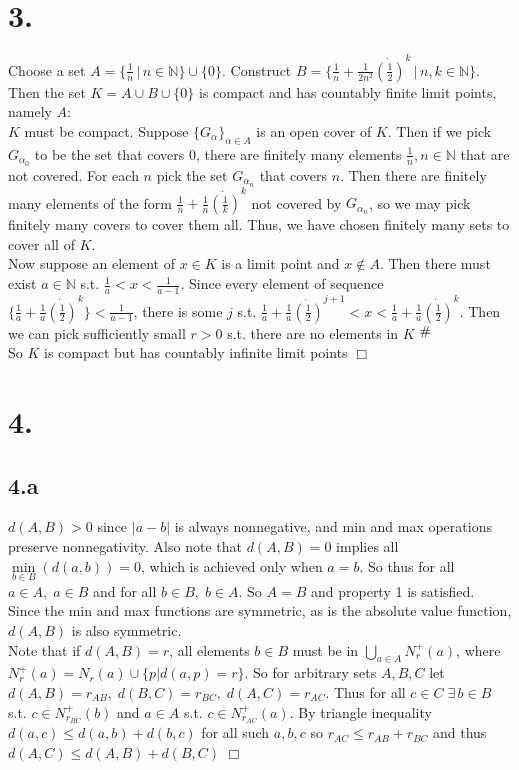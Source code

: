 \documentclass{article}
\newcommand{\contra}{\raisebox{\depth}{\#}}
\begin{document}
\section*{3.}
Choose a set $A = \{\frac{1}{n}\, |\, n \in \mathbb{N}\} \cup \{0\}$. Construct $B = \{\frac{1}{n} + \frac{1}{2n^2}\dot {\left(\frac{1}{2}\right)}^k\, |\, n , k \in \mathbb{N}\}$. Then the set $K = A\cup B \cup \{0\}$ is compact and has countably finite limit points, namely $A$:\\
$K$ must be compact. Suppose $\{G_\alpha\}_{\alpha \in A }$ is an open cover of $K$. Then if we pick $G_{\alpha_0}$ to be the set that covers $0$, there are finitely many elements $\frac{1}{n}, n \in \mathbb{N}$ that are not covered. For each $n$ pick the set $G_{\alpha_n}$ that covers $n$. Then there are finitely many elements of the form $\frac{1}{n} + \frac{1}{n} \dot {\left(\frac{1}{k}\right)}^k$ not covered by $G_{\alpha_n}$, so we may pick finitely many covers to cover them all. Thus, we have chosen finitely many sets to cover all of $K$.\\
Now suppose an element of $x\in K$ is a limit point and $x \notin A$. Then there must exist $a \in \mathbb{N}$ s.t. $\frac{1}{a} < x < \frac{1}{a-1}$. Since every element of sequence $\{\frac{1}{a} + \frac{1}{a} \dot {\left(\frac{1}{2}\right)}^k\} < \frac{1}{a-1}$, there is some $j$ s.t. $\frac{1}{a} + \frac{1}{a} \dot {\left(\frac{1}{2}\right)}^{j+1} < x < \frac{1}{a} + \frac{1}{a} \dot {\left(\frac{1}{2}\right)}^k$. Then we can pick sufficiently small $r>0$ s.t. there are no elements in $K$ $\contra$ \\
So $K$ is compact but has countably infinite limit points $\Box$

\section*{4.}
\subsection*{4.a}
$d(A,B)>0$ since $|a-b|$ is always nonnegative, and min and max operations preserve nonnegativity. Also note that $d(A,B) = 0$ implies all $\min\limits_{b \in B}(d(a,b)) = 0$, which is achieved only when $a = b$. So thus for all $a \in A,\; a \in B$ and for all $b \in B,\; b \in A$. So $A = B$ and property 1 is satisfied.\\
Since the min and max functions are symmetric, as is the absolute value function, $d(A,B)$ is also symmetric.\\
Note that if $d(A,B) = r$, all elements $b \in B$ must be in $\bigcup\limits_{a \in A} N_r^+ (a)$, where $N_r^+ (a) = N_r (a) \cup \{p | d(a,p) = r\}$. So for arbitrary sets $A, B, C$ let $d(A,B) = r_{AB}, \; d(B,C) = r_{BC}, \; d(A,C) = r_{AC}$. Thus for all $c \in C\; \exists \, b \in B$ s.t. $c \in N_{r_{BC}}^+ (b)$ and $a \in A$ s.t. $c \in N_{r_{AC}}^+ (a)$. By triangle inequality $d(a,c) \leq d(a,b) + d(b,c)$ for all such $a,b,c$ so $r_{AC} \leq r_{AB} + r_{BC}$ and thus $d(A,C) \leq d(A,B) + d(B,C)$ $\Box$
\end{document}
